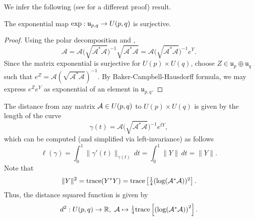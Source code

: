 \hf We infer the following (see \cite[ Lemma 1, page 211]{YaSt75} for a different proof) result.
\begin{cor}\label{expsurj}
    The exponential map $\textup{exp}:\mathfrak{u}_{p,q}\to U(p,q)$ is surjective.
\end{cor}
\begin{proof}
    Using the polar decomposition and , 
    \begin{displaymath}
        \mathcal{A}=\mathcal{A}\big(\sqrt{\mathcal{A}^\ast\mathcal{A}}\big)^{-1}\sqrt{\mathcal{A}^\ast\mathcal{A}}=\mathcal{A}\big(\sqrt{\mathcal{A}^\ast\mathcal{A}}\big)^{-1}e^Y.
    \end{displaymath}
    Since the matrix exponential is surjective for $U(p)\times U(q)$, choose $Z\in \mathfrak{u}_p\oplus\mathfrak{u}_q$ such that $e^Z=\mathcal{A}(\sqrt{\mathcal{A}^\ast\mathcal{A}})^{-1}$. By Baker-Campbell-Hausdorff formula, we may express $e^Z e^Y$ as exponential of an element in $\mathfrak{u}_{p,q}$. 
\end{proof}

\hf The distance from any matrix $\mathcal{A}\in U(p,q)$ to $U(p)\times U(q)$ is given by the length of the curve
\begin{displaymath}
    \gamma(t)=\mathcal{A}\big(\sqrt{\mathcal{A}^\ast\mathcal{A}}\big)^{-1}e^{tY},
\end{displaymath}
which can be computed (and simplified via left-invariance) as follows
\begin{displaymath}
    \ell(\gamma)=\int_0^1 \|\gamma'(t)\|_{\gamma(t)}\,dt=\int_0^1 \|Y\|\,dt=\|Y\|.
\end{displaymath}
Note that 
\begin{displaymath}
    \|Y\|^2=\textup{trace}(Y^\ast Y)=\textup{trace}\left[\textstyle{\frac{1}{4}}(\log (\mathcal{A}^\ast\mathcal{A}))^2\right].
\end{displaymath}
Thus, the distance squared function is given by 
\begin{displaymath}
    d^2:U(p,q)\to\mathbb{R},\,\,\mathcal{A}\mapsto \textstyle{\frac{1}{4}}\textup{trace}\left[\left(\log (\mathcal{A}^\ast\mathcal{A})\right)^2\right].
\end{displaymath}